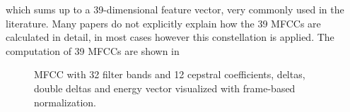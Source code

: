 which sums up to a 39-dimensional feature vector, very commonly used in the literature.
Many papers do not explicitly explain how the 39 MFCCs are calculated in detail, in most cases however this constellation is applied.
The computation of 39 MFCCs are shown in 
\begin{figure}[!ht]
  \centering
  \caption{MFCC with 32 filter bands and 12 cepstral coefficients, deltas, double deltas and energy vector visualized with frame-based normalization.}
  \label{fig:signal_mfcc_showcase_mfcc39}
\end{figure}
\FloatBarrier
\noindent


